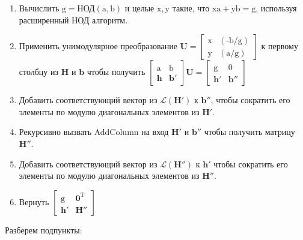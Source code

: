 \begin{enumerate}
\item Вычислить $ \mathrm{g}=\text{НОД}⁡(\mathrm{a, b}) $ и целые $ \mathrm{x, y} $ такие, что $ \mathrm{xa+yb=g} $, используя расширенный НОД алгоритм.
\item Применить унимодулярное преобразование 
$ \mathbf{U}=\left[ \begin{array}{cccc}
\mathrm{x} & \mathrm{(\text{-}b/g)} \\ 
\mathrm{y} & \mathrm{(a/g)} \end{array} \right] $ к первому столбцу из $ \mathbf{H} $ и $ \mathbf{b} $ чтобы получить 
$ \left[ \begin{array}{cccc}
\mathrm{a} & \mathrm{b} \\
\mathbf{h} & \mathbf{b}' \end{array} \right] \mathbf{U}=
\left[ \begin{array}{cccc}
\mathrm{g} & \mathrm{0} \\
\mathbf{h}' & \mathbf{b}'' \end{array} \right] $ 
\item Добавить соответствующий вектор из $ \mathcal{L}\left(\mathbf{H}'\right) $ к $ \mathbf{b}'' $, чтобы сократить его элементы по модулю диагональных элементов из $ \mathbf{H}' $.
\item Рекурсивно вызвать AddColumn на вход $ \mathbf{H}' $ и $ \mathbf{b}'' $ чтобы получить матрицу $ \mathbf{H}'' $.
\item Добавить соответствующий вектор из $ \mathcal{L}\left(\mathbf{H}''\right) $ к $ \mathbf{h}' $ чтобы сократить его элементы по модулю диагональных элементов из $ \mathbf{H}'' $.
\item Вернуть $ \left[\begin{array}{cccc}
\mathrm{g} & \mathbf{0}^\mathrm{T} \\
\mathbf{h}' & \mathbf{H}'' 
\end{array}\right] $ 

\end{enumerate}

Разберем подпункты:

